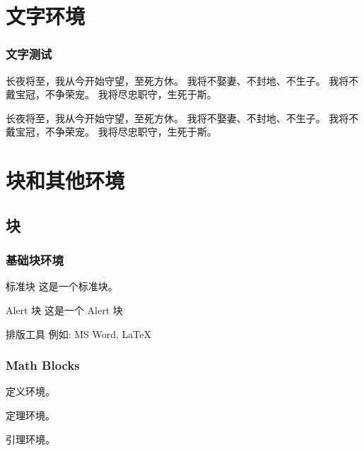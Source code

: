 \frame[plain]{\titlepage}

\section{文字环境}

\begin{frame}
    \frametitle{文字测试}
    
    长夜将至，我从今开始守望，至死方休。
    我将不娶妻、不封地、不生子。
    我将不戴宝冠，不争荣宠。
    我将尽忠职守，生死于斯。

    \vspace{0.4cm}

    \pause

    长夜将至，我从今开始守望，至死方休。
    我将不娶妻、不封地、不生子。
    我将不戴宝冠，不争荣宠。
    我将尽忠职守，生死于斯。
    
\end{frame}

\section{块和其他环境}
\subsection{块}

\begin{frame}
    \frametitle{基础块环境}

    \begin{block}{标准块}
        这是一个标准块。
    \end{block}
    \begin{alertblock}{Alert 块}
        这是一个 Alert 块
    \end{alertblock}
    \begin{exampleblock}{排版工具}
        例如: MS Word, \LaTeX{}
    \end{exampleblock}

\end{frame}

\begin{frame}
    \frametitle{Math Blocks}

    \begin{definition} 
        定义环境。
    \end{definition}
    
    \begin{theorem} 
        定理环境。
    \end{theorem}
    
    \begin{lemma} 
        引理环境。
    \end{lemma}

\end{frame}


